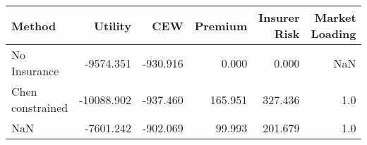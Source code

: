 \begin{tabular}{lrrrrr}
\toprule
          Method &    Utility &      CEW &  Premium &  Insurer Risk &  Market Loading \\
\midrule
    No Insurance &  -9574.351 & -930.916 &    0.000 &         0.000 &             NaN \\
Chen constrained & -10088.902 & -937.460 &  165.951 &       327.436 &             1.0 \\
             NaN &  -7601.242 & -902.069 &   99.993 &       201.679 &             1.0 \\
\bottomrule
\end{tabular}
